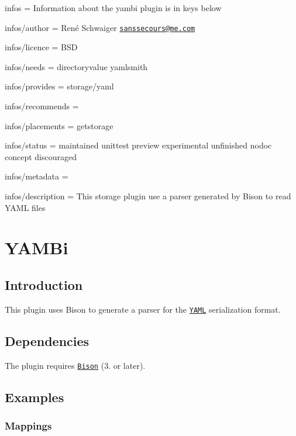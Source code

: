 
\begin{DoxyItemize}
\item infos = Information about the yambi plugin is in keys below
\item infos/author = René Schwaiger \href{mailto:sanssecours@me.com}{\tt sanssecours@me.\+com}
\item infos/licence = B\+SD
\item infos/needs = directoryvalue yamlsmith
\item infos/provides = storage/yaml
\item infos/recommends =
\item infos/placements = getstorage
\item infos/status = maintained unittest preview experimental unfinished nodoc concept discouraged
\item infos/metadata =
\item infos/description = This storage plugin use a parser generated by Bison to read Y\+A\+ML files
\end{DoxyItemize}\hypertarget{md_src_plugins_yambi_README_src_plugins_yambi_README_md}{}\section{Y\+A\+M\+Bi}\label{md_src_plugins_yambi_README_src_plugins_yambi_README_md}
\subsection*{Introduction}

This plugin uses Bison to generate a parser for the \href{http://yaml.org}{\tt Y\+A\+ML} serialization format.

\subsection*{Dependencies}

The plugin requires \href{https://www.gnu.org/software/bison/}{\tt Bison} (3. or later).

\subsection*{Examples}

\subsubsection*{Mappings}


